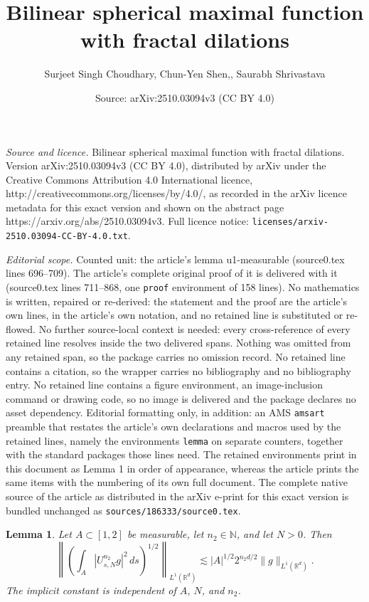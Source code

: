 \documentclass[10pt,a4paper]{amsart}
\title{Bilinear spherical maximal function with fractal dilations}
\author{Surjeet Singh Choudhary, Chun-Yen Shen,, Saurabh Shrivastava}
\date{Source: arXiv:2510.03094v3 (CC BY 4.0)}
\newtheorem{lemma}{Lemma}
\begin{document}
\maketitle

\noindent\emph{Source and licence.} Bilinear spherical maximal function with fractal dilations. Version arXiv:2510.03094v3 (CC BY 4.0), distributed by arXiv under the Creative Commons Attribution 4.0 International licence, http://creativecommons.org/licenses/by/4.0/, as recorded in the arXiv licence metadata for this exact version and shown on the abstract page https://arxiv.org/abs/2510.03094v3. Full licence notice: \texttt{licenses/arxiv-2510.03094-CC-BY-4.0.txt}.\par\smallskip

\noindent\textit{Editorial scope.} Counted unit: the article's lemma u1-measurable (source0.tex lines 696--709). The article's complete original proof of it is delivered with it (source0.tex lines 711--868, one \texttt{proof} environment of 158 lines). No mathematics is written, repaired or re-derived: the statement and the proof are the article's own lines, in the article's own notation, and no retained line is substituted or re-flowed.  No further source-local context is needed: every cross-reference of every retained line resolves inside the two delivered spans.  Nothing was omitted from any retained span, so the package carries no omission record.  No retained line contains a citation, so the wrapper carries no bibliography and no bibliography entry.  No retained line contains a figure environment, an image-inclusion command or drawing code, so no image is delivered and the package declares no asset dependency.  Editorial formatting only, in addition: an AMS \texttt{amsart} preamble that restates the article's own declarations and macros used by the retained lines, namely the environments \texttt{lemma} on separate counters, together with the standard packages those lines need.  The retained environments print in this document as Lemma 1 in order of appearance, whereas the article prints the same items with the numbering of its own full document.  The complete native source of the article as distributed in the arXiv e-print for this exact version is bundled unchanged as \texttt{sources/186333/source0.tex}.
	\begin{lemma}\label{u1-measurable}
		Let \(A\subset[1,2]\) be measurable, let \(n_2\in\mathbb N\),
		and let \(N>0\). Then
		\begin{equation}\label{u1-set}
			\left\|
			\left(
			\int_A |U_{s,N}^{n_2}g|^2\,ds
			\right)^{1/2}
			\right\|_{L^1(\mathbb R^d)}
			\lesssim
			|A|^{1/2}2^{n_2d/2}\|g\|_{L^1(\mathbb R^d)}.
		\end{equation}
		The implicit constant is independent of \(A\), \(N\), and \(n_2\).
	\end{lemma}
\end{document}
